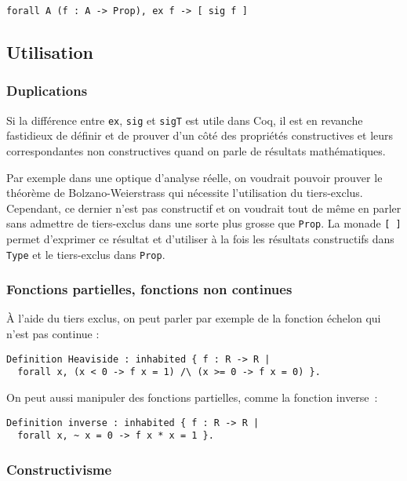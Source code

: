 \documentclass[10pt]{article}
\begin{document}
\begin{verbatim}
forall A (f : A -> Prop), ex f -> [ sig f ]
\end{verbatim}


\subsection{Utilisation}

\subsubsection{Duplications}

Si la différence entre {\tt ex}, {\tt sig} et {\tt sigT} est utile dans Coq, il est en revanche fastidieux de définir et de prouver d'un côté des propriétés constructives et leurs correspondantes non constructives quand on parle de résultats mathématiques.

Par exemple dans une optique d'analyse réelle, on voudrait pouvoir prouver le théorème de Bolzano-Weierstrass qui nécessite l'utilisation du tiers-exclus. Cependant, ce dernier n'est pas constructif et on voudrait tout de même en parler sans admettre de tiers-exclus dans une sorte plus grosse que {\tt Prop}. La monade {\tt [ ]} permet d'exprimer ce résultat et d'utiliser à la fois les résultats constructifs dans {\tt Type} et le tiers-exclus dans {\tt Prop}.

\subsubsection{Fonctions partielles, fonctions non continues}

À l'aide du tiers exclus, on peut parler par exemple de la fonction échelon qui n'est pas continue :

\begin{verbatim}
Definition Heaviside : inhabited { f : R -> R |
  forall x, (x < 0 -> f x = 1) /\ (x >= 0 -> f x = 0) }.
\end{verbatim}

On peut aussi manipuler des fonctions partielles, comme la fonction inverse~:

\begin{verbatim}
Definition inverse : inhabited { f : R -> R |
  forall x, ~ x = 0 -> f x * x = 1 }.
\end{verbatim}

\subsubsection{Constructivisme}
\end{document}
